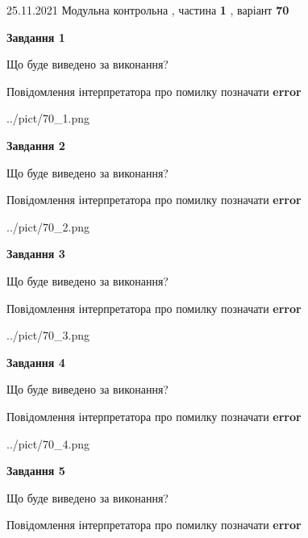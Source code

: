 \documentclass[10pt, ukrainian]{article}
\begin{document}
{25.11.2021 Модульна контрольна , частина \textbf { 1 }, варіант  \No \textbf { 70 }\par}
{
\begin {large}

{\begin {center}\textbf{Завдання 1}\end {center}}\par
Що буде виведено за виконання? \par
Повідомлення інтерпретатора про помилку позначати \textbf{error}

\begin{center}
	{../pict/70_1.png}
\end{center}
\newpage

{\begin {center}\textbf{Завдання 2}\end {center}}\par
Що буде виведено за виконання? \par
Повідомлення інтерпретатора про помилку позначати \textbf{error}

\begin{center}
	{../pict/70_2.png}
\end{center}
\newpage

{\begin {center}\textbf{Завдання 3}\end {center}}\par
Що буде виведено за виконання? \par
Повідомлення інтерпретатора про помилку позначати \textbf{error}

\begin{center}
	{../pict/70_3.png}
\end{center}
\newpage

{\begin {center}\textbf{Завдання 4}\end {center}}\par
Що буде виведено за виконання? \par
Повідомлення інтерпретатора про помилку позначати \textbf{error}

\begin{center}
	{../pict/70_4.png}
\end{center}
\newpage

{\begin {center}\textbf{Завдання 5}\end {center}}\par
Що буде виведено за виконання? \par
Повідомлення інтерпретатора про помилку позначати \textbf{error}


\end{large}}
\end{document}
